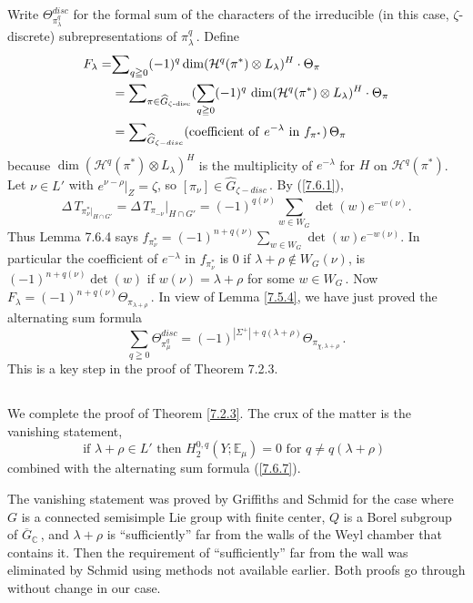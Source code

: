 \documentclass{conm-p-l}
\def\C{\mathbb{C}}
\def\E{\mathbb{E}}
\def\cH{\mathcal{H}}
\begin{document}
Write $\Theta_{\pi^q_\lambda}^{disc}$ for the formal sum of the 
characters of the irreducible (in this case,  $\zeta$-discrete) 
subrepresentations of $\pi^q_\lambda$\,.  Define 
$$
\begin{aligned}
F_\lambda = &{\sum}_{q \geqq 0} (-1)^q 
        \dim (\cH^q(\pi^*)\otimes L_\lambda)^H\cdot \Theta_\pi\\
	&= {\sum}_{\pi \in \widehat{G}_{\zeta\text{-disc}}}
	(\sum_{q \geqq 0} (-1)^q\,
	\dim (\cH^q(\pi^*)\otimes L_\lambda)^H\cdot \Theta_\pi \\
	&= {\sum}_{\widehat{G}_{\zeta-disc}}
        {\rm (coefficient\,\, of \,\,}e^{-\lambda} {\rm \,\,in\,\, } 
        f_{\pi^*})\, \Theta_\pi
\end{aligned}
$$
because $\dim (\cH^q(\pi^*)\otimes L_\lambda)^H$ is the 
multiplicity of $e^{-\lambda}$ for $H$ on $\cH^q(\pi^*)$.
Let $\nu \in L'$ with $e^{\nu - \rho}|_Z = \zeta$, so
$[\pi_\nu] \in \widehat{G}_{\zeta-disc}$\,.  By (\ref{7.6.1}),
$$
\Delta\, T_{\pi_\nu^*|_{H \cap G'}}
	= \Delta\, T_{\pi_{-\nu}}|_{H \cap G'} = (-1)^{q(\nu)}
	\sum_{w \in W_G} \det(w)e^{-w(\nu)}.
$$
Thus Lemma 7.6.4 says $f_{\pi_\nu^*} = (-1)^{n + q(\nu)}
	\sum_{w \in W_G} \det(w)e^{-w(\nu)}$. 
In particular the coefficient of $e^{-\lambda}$ in $f_{\pi_\nu^*}$ is $0$ if
$\lambda + \rho \not\in W_G(\nu)$, is $(-1)^{n + q(\nu)}\det(w)$ if $w(\nu)
= \lambda + \rho$ for some $w \in W_G$\,.  Now $F_\lambda = (-1)^{n + q(\nu)}
	\Theta_{\pi_{\lambda + \rho}}$\,.
In view of Lemma \ref{7.5.4}, we have just proved the alternating sum formula
\begin{equation}\label{7.6.7}
{\sum}_{q \geqq 0} \Theta^{disc}_{\pi_\mu^q} =
 (-1)^{|\Sigma^+| + q(\lambda + \rho)}\Theta_{\pi_{\chi, \lambda + \rho}}\,.
\end{equation}
This is a key step in the proof of Theorem 7.2.3.

\subsection{}\label{ssec7g}\setcounter{equation}{0}
We complete the proof of Theorem \ref{7.2.3}.  The crux of the matter is the
vanishing statement, 
$$
\text{ if $\lambda + \rho \in L'$ then
		$H^{0,q}_2(Y;\E_\mu) = 0$ for $q \ne q(\lambda + \rho)$ }
$$
combined with the alternating sum formula (\ref{7.6.7}).

The vanishing statement was proved by Griffiths and Schmid 
\cite[Theorem 7.8]{GS1969} for the case where $G$ is a connected semisimple 
Lie group with finite center, $Q$ is a Borel subgroup of $\overline{G}_\C$\,, 
and $\lambda + \rho$ is ``sufficiently'' far from the walls of the Weyl 
chamber that contains it.  Then the requirement of ``sufficiently''
far from the wall was eliminated by Schmid \cite{S1976} using methods not 
available earlier.  Both proofs go through without change in our case. 
\end{document}
